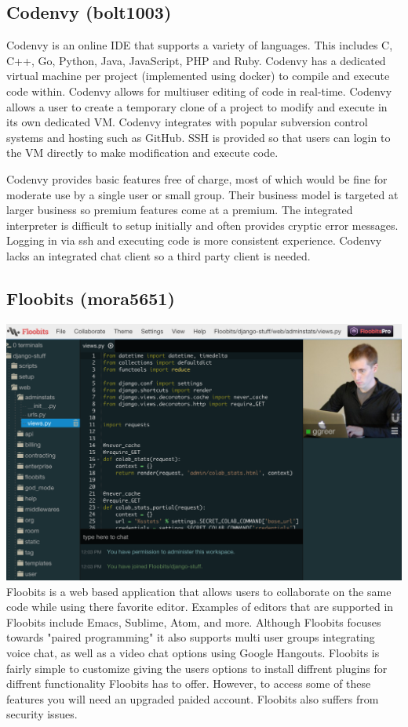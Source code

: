 \documentclass[11pt]{report}
\begin{document}
\begin{IDE-like Features}
\begin{}
\begin{Collaborative features that would be "nice":}
\subsection{Codenvy (bolt1003)}
Codenvy is an online IDE that supports a variety of languages. This includes C, C++, Go, Python, Java, JavaScript, PHP and Ruby. Codenvy has a dedicated virtual machine per project (implemented using docker) to compile and execute code within. Codenvy allows for multiuser editing of code in real-time. Codenvy allows a user to create a temporary clone of a project to modify and execute in its own dedicated VM. Codenvy integrates with popular subversion control systems and hosting such as GitHub. SSH is provided so that users can login to the VM directly to make modification and execute code.


Codenvy provides basic features free of charge, most of which would be fine for moderate use by a single user or small group.  Their business model is targeted at larger business so premium features come at a premium. The integrated interpreter is difficult to setup initially and often provides cryptic error messages. Logging in via ssh and executing code is more consistent experience. Codenvy lacks an integrated chat client so a third party client is needed.

\subsection{Floobits (mora5651)}
\includegraphics[width=\textwidth]{Floobits}
Floobits is a web based application that allows users to collaborate on the same code while using there favorite editor. Examples of editors that are supported in Floobits include Emacs, Sublime, Atom, and more. Although Floobits focuses towards "paired programming" it also supports multi user groups integrating voice chat, as well as a video chat options using Google Hangouts. Floobits is fairly simple to customize giving the users options to install diffrent plugins for diffrent functionality Floobits has to offer. However, to access some of these features you will need an upgraded paided account. Floobits also suffers from security issues.


\end{Collaborative features that would be "nice":}
\end{}
\end{IDE-like Features}
\end{document}
